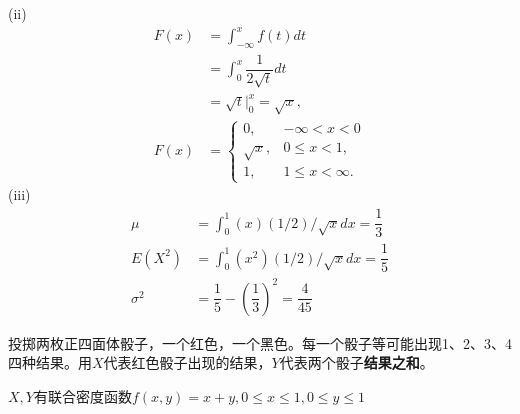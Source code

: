 \documentclass[11pt,addpoints]{exam}
\begin{document}
\begin{questions}
\begin{parts}
			(ii)
	 		$$\begin{aligned}
	 			F(x) & =\int_{-\infty}^{x} f(t) d t \\
	 			& =\int_{0}^{x} \dfrac{1}{2 \sqrt{t}} d t \\
	 			& =\sqrt{t}|_{0}^{x}=\sqrt{x}, \\
	 			F(x) & = \begin{cases}0, & -\infty<x<0 \\
	 				\sqrt{x}, & 0 \leq x<1, \\
	 				1, & 1 \leq x<\infty .\end{cases}
	 		\end{aligned}
	 		$$
	 		(iii)
	 		$$
	 		\begin{aligned}
	 			\mu & =\int_{0}^{1}(x)(1 / 2) / \sqrt{x} d x=\dfrac{1}{3} \\
	 			E\left(X^{2}\right) & =\int_{0}^{1}\left(x^{2}\right)(1 / 2) / \sqrt{x} d x=\dfrac{1}{5} \\
	 			\sigma^{2} & =\dfrac{1}{5}-\left(\dfrac{1}{3}\right)^{2}=\dfrac{4}{45}
	 		\end{aligned}
	 		$$
	 	\end{parts}
	 	
	 	\question
	 	投掷两枚正四面体骰子，一个红色，一个黑色。每一个骰子等可能出现1、2、3、4四种结果。用$X$代表红色骰子出现的结果，$Y$代表两个骰子\textbf{结果之和}。
	 	\newpage
	 	\question
	 	$X, Y$有联合密度函数$f(x, y) = x + y, 0 \leq x \leq 1, 0 \leq y \leq 1$
	 	\begin{parts}

\end{parts}
\end{questions}
\end{document}
